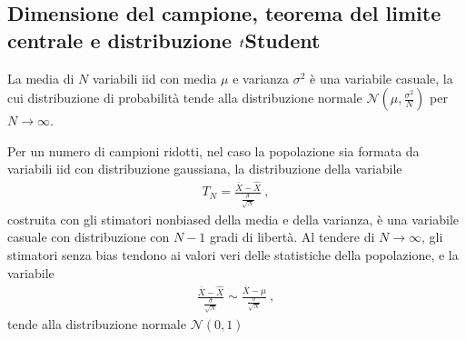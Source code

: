 \documentclass[letterpaper,10pt,italian]{jupyterBook}
\begin{document}
\subsection{Dimensione del campione, teorema del limite centrale e distribuzione \protect\(t\protect\)\sphinxhyphen{}Student}
\label{\detokenize{ch/statistics/sampling:dimensione-del-campione-teorema-del-limite-centrale-e-distribuzione-t-student}}
\sphinxAtStartPar
La media di \(N\) variabili iid con media \(\mu\) e varianza \(\sigma^2\) è una variabile casuale, la cui distribuzione di probabilità tende alla distribuzione normale \(\mathscr{N}\left(\mu, \frac{\sigma^2}{N} \right)\) per \(N \rightarrow \infty\).

\sphinxAtStartPar
Per un numero di campioni ridotti, nel caso la popolazione sia formata da variabili iid con distribuzione gaussiana, la distribuzione della variabile
\begin{equation*}
\begin{split}T_N = \frac{\bar{X} - \hat{X}}{\frac{\hat{\sigma}}{\sqrt{N}}} \ ,\end{split}
\end{equation*}
\sphinxAtStartPar
costruita con gli stimatori non\sphinxhyphen{}biased della media e della varianza, è una variabile casuale con distribuzione  con \(N-1\) gradi di libertà. Al tendere di \(N \rightarrow \infty\), gli stimatori senza bias tendono ai valori veri delle statistiche della popolazione, e la variabile
\begin{equation*}
\begin{split}\frac{\bar{X} - \hat{X}}{\frac{\hat{\sigma}}{\sqrt{N}}} \sim \frac{\bar{X} - \mu}{\frac{\sigma}{\sqrt{N}}} \ ,\end{split}
\end{equation*}
\sphinxAtStartPar
tende alla distribuzione normale \(\mathscr{N}(0,1)\)
\end{document}
